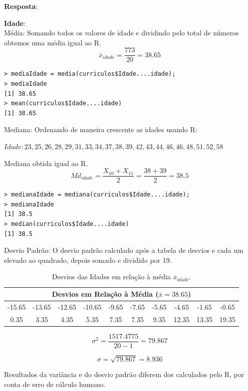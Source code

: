 \documentclass[a4paper,11pt]{article}
\begin{document}
\begin{description}[leftmargin=*]

\item[2.1] \textbf{Resposta}:

\item \textbf{Idade}: \\
Média:
Somando todos os valores de idade e dividindo pelo total de números obtemos uma média igual ao R.
\[\overline{x}_{idade} = \frac{773}{20} = 38.65\]

\begin{lstlisting}
> mediaIdade = media(curriculos$Idade....idade);
> mediaIdade
[1] 38.65
> mean(curriculos$Idade....idade)
[1] 38.65    
\end{lstlisting}

Mediana:
Ordenando de maneira crescente as idades usando R:

$Idade: 23, 25, 26, 28, 29, 31, 33, 34, 37, 38, 39, 42, 43, 44, 46, 46, 48, 51, 52, 58$

Mediana obtida igual ao R.
\[Md_{idade} = \frac{X_{10}+X_{11}}{2} = \frac{38+39}{2} =38.5\]

\begin{lstlisting}
> medianaIdade = mediana(curriculos$Idade....idade);
> medianaIdade
[1] 38.5
> median(curriculos$Idade....idade)
[1] 38.5
\end{lstlisting}

Desvio Padrão:
O desvio padrão calculado após a tabela de desvios e cada um elevado ao quadrado, depois somado e dividido por 19.
\begin{table}[H]
    \centering
    \begin{tabular}{cccccccccc}
        \hline
        \multicolumn{10}{c}{\textbf{Desvios em Relação à Média ($\overline{x} = 38.65$)}}\\
        \hline
        -15.65 & -13.65 & -12.65 & -10.65 & -9.65 & -7.65 & -5.65 & -4.65 & -1.65 & -0.65 \\ 
         0.35 & 3.35 & 4.35 & 5.35 & 7.35 & 7.35 & 9.35 & 12.35 & 13.35 & 19.35 \\
        \hline
    \end{tabular}
    \caption{Desvios das Idades em relação à média $\overline{x}_{\text{idade}}$.}
    \label{tab:desvios_idade}
\end{table}

\[\sigma^2 = \frac{ 1517.4775}{20-1} = 79.867\]

\[\sigma = \sqrt{79.867} = 8.936\]

Resultados da variância e do desvio padrão diferem dos calculados pelo R, por conta de erro de cálculo humano.


\end{description}
\end{document}
